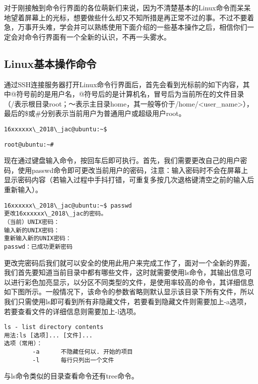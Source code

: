 对于刚接触到命令行界面的各位萌新们来说，因为不清楚基本的Linux命令而呆呆地望着屏幕上的光标，想要做些什么却又不知所措是再正常不过的事。不过不要着急，万事开头难，学会并可以熟练使用下面介绍的一些基本操作之后，相信你们一定会对命令行界面有一个全新的认识，不再一头雾水。

\subsection{Linux基本操作命令}
通过SSH连接服务器打开Linux命令行界面后，首先会看到光标前的如下内容，其中@符号前的是用户名，@符号后的是计算机名，冒号后为当前所在的文件目录（/表示根目录root；～表示主目录home，其一般等价于/home/<user\_name>），最后的\$或\#分别表示当前用户为普通用户或超级用户root。

\begin{verbatim}
16xxxxxx\_2018\_jac@ubuntu:~$
\end{verbatim}
\begin{verbatim}
root@ubuntu:~#
\end{verbatim}

现在通过键盘输入命令，按回车后即可执行。首先，我们需要更改自己的用户密码，使用passwd命令即可更改当前用户的密码，注意：输入密码时不会在屏幕上显示密码内容（若输入过程中手抖打错，可重复多按几次退格键清空之前的输入后重新输入）。

\begin{verbatim}
16xxxxxx\_2018\_jac@ubuntu:~$ passwd
更改16xxxxxx\_2018\_jac的密码。
（当前）UNIX密码：
输入新的UNIX密码：
重新输入新的UNIX密码：
passwd：已成功更新密码
\end{verbatim}

更改完密码后我们就可以安全的使用此用户来完成工作了，面对一个全新的界面，我们首先要知道当前目录中都有哪些文件，这时就需要使用ls命令，其输出信息可以进行彩色加亮显示，以分区不同类型的文件，是使用率较高的命令，其详细信息如下图所示。一般情况下，该命令的参数省略则默认显示该目录下所有文件，所以我们只需使用ls即可看到所有非隐藏文件，若要看到隐藏文件则需要加上-a选项，若要查看文件的详细信息则需要加上-l选项。

\begin{verbatim}
ls - list directory contents
用法:ls [选项]... [文件]...
选项（常用）：
		-a		不隐藏任何以. 开始的项目
		-l		每行只列出一个文件
\end{verbatim}

\begin{note}
与ls命令类似的目录查看命令还有tree命令。
\end{note}

